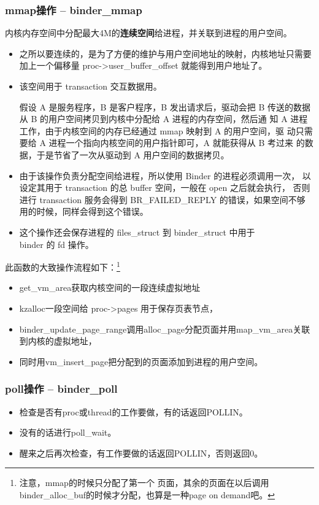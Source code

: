 \documentclass[a4paper,11pt]{article}
\begin{document}
\subsubsection{mmap操作 -- binder_mmap}
内核内存空间中分配最大4M的\textbf{\color{red}连续空间}给进程，并关联到进程的用户空间。
\begin{itemize}
    \item 之所以要连续的，是为了方便的维护与用户空间地址的映射，内核地址只需要
        加上一个偏移量 proc->user_buffer_offset 就能得到用户地址了。
    \item 该空间用于 transaction 交互数据用。

        {\footnotesize 假设 A 是服务程序，B 是客户程序，B 发出请求后，驱动会把
        B 传送的数据从 B 的用户空间拷贝到内核中分配给 A 进程的内存空间，然后通
        知 A 进程工作，由于内核空间的内存已经通过 mmap 映射到 A 的用户空间，驱
        动只需要给 A 进程一个指向内核空间的用户指针即可，A 就能获得从 B 考过来
        的数据，于是节省了一次从驱动到 A 用户空间的数据拷贝。}
    \item 由于该操作负责分配空间给进程，所以使用 Binder 的进程必须调用一次，
        以设定其用于 transaction 的总 buffer 空间，一般在 open 之后就会执行，
        否则进行 transaction 服务会得到 BR_FAILED_REPLY 的错误，如果空间不够
        用的时候，同样会得到这个错误。
    \item 这个操作还会保存进程的 files_struct 到 binder_struct 中用于\\ binder
        的 fd 操作。
\end{itemize}
此函数的大致操作流程如下：\footnote{\color{blue}注意，mmap的时候只分配了第一个
页面，其余的页面在以后调用binder_alloc_buf的时候才分配，也算是一种page on
demand吧。}
\begin{itemize}
    \item get_vm_area获取内核空间的一段连续虚拟地址
    \item kzalloc一段空间给 proc->pages 用于保存页表节点，
    \item binder_update_page_range调用alloc_page分配页面并用map_vm_area关联到内核的虚拟地址，
    \item 同时用vm_insert_page把分配到的页面添加到进程的用户空间。
\end{itemize}

\subsubsection{poll操作 -- binder_poll}
\begin{itemize}
    \item 检查是否有proc或thread的工作要做，有的话返回POLLIN。
    \item 没有的话进行poll_wait。
    \item 醒来之后再次检查，有工作要做的话返回POLLIN，否则返回0。
\end{itemize}
\end{document}
